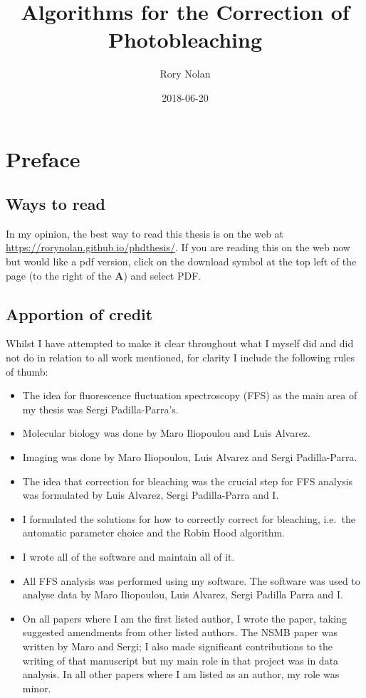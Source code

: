 \documentclass[12pt,]{book}
\title{Algorithms for the Correction of Photobleaching}
\author{Rory Nolan}
\date{2018-06-20}
\providecommand{\tightlist}{%
  \setlength{\itemsep}{0pt}\setlength{\parskip}{0pt}}
\theoremstyle{definition}
\theoremstyle{definition}
\theoremstyle{definition}
\theoremstyle{remark}
\begin{document}
\maketitle

{
\hypersetup{linkcolor=blue}
\setcounter{tocdepth}{1}
\tableofcontents
}
\chapter*{Preface}\label{preface}

\section*{Ways to read}\label{ways-to-read}

In my opinion, the best way to read this thesis is on the web at
\url{https://rorynolan.github.io/phdthesis/}. If you are reading this on
the web now but would like a pdf version, click on the download symbol
at the top left of the page (to the right of the \textbf{A}) and select
PDF.

\section*{Apportion of credit}\label{apportion-of-credit}

Whilst I have attempted to make it clear throughout what I myself did
and did not do in relation to all work mentioned, for clarity I include
the following rules of thumb:

\begin{itemize}
\tightlist
\item
  The idea for fluorescence fluctuation spectroscopy (FFS) as the main
  area of my thesis was Sergi Padilla-Parra's.
\item
  Molecular biology was done by Maro Iliopoulou and Luis Alvarez.
\item
  Imaging was done by Maro Iliopoulou, Luis Alvarez and Sergi
  Padilla-Parra.
\item
  The idea that correction for bleaching was the crucial step for FFS
  analysis was formulated by Luis Alvarez, Sergi Padilla-Parra and I.
\item
  I formulated the solutions for how to correctly correct for bleaching,
  i.e.~the automatic parameter choice and the Robin Hood algorithm.
\item
  I wrote all of the software and maintain all of it.
\item
  All FFS analysis was performed using my software. The software was
  used to analyse data by Maro Iliopoulou, Luis Alvarez, Sergi Padilla
  Parra and I.
\item
  On all papers where I am the first listed author, I wrote the paper,
  taking suggested amendments from other listed authors. The NSMB paper
  \citep{HIVstoichiometry} was written by Maro and Sergi; I also made
  significant contributions to the writing of that manuscript but my
  main role in that project was in data analysis. In all other papers
  where I am listed as an author, my role was minor.
\end{itemize}
\end{document}
